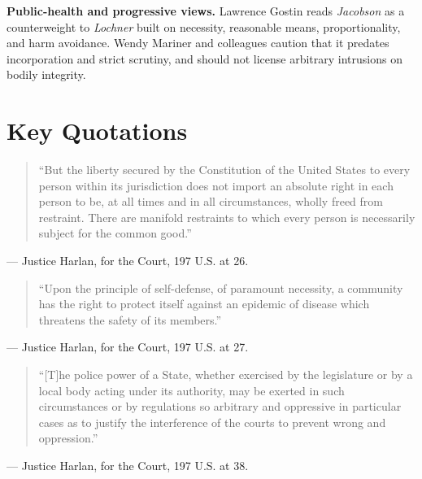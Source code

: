 \documentclass[12pt]{article}
\begin{document}
\textbf{Public-health and progressive views.} Lawrence Gostin reads \textit{Jacobson} as a counterweight to \textit{Lochner} built on necessity, reasonable means, proportionality, and harm avoidance. Wendy Mariner and colleagues caution that it predates incorporation and strict scrutiny, and should not license arbitrary intrusions on bodily integrity.

\section{Key Quotations}

\begin{quote}
``But the liberty secured by the Constitution of the United States to every person within its jurisdiction does not import an absolute right in each person to be, at all times and in all circumstances, wholly freed from restraint. There are manifold restraints to which every person is necessarily subject for the common good.''
\end{quote}
\noindent --- Justice Harlan, for the Court, 197 U.S. at 26.

\begin{quote}
``Upon the principle of self-defense, of paramount necessity, a community has the right to protect itself against an epidemic of disease which threatens the safety of its members.''
\end{quote}
\noindent --- Justice Harlan, for the Court, 197 U.S. at 27.

\begin{quote}
``[T]he police power of a State, whether exercised by the legislature or by a local body acting under its authority, may be exerted in such circumstances or by regulations so arbitrary and oppressive in particular cases as to justify the interference of the courts to prevent wrong and oppression.''
\end{quote}
\noindent --- Justice Harlan, for the Court, 197 U.S. at 38.
\end{document}
